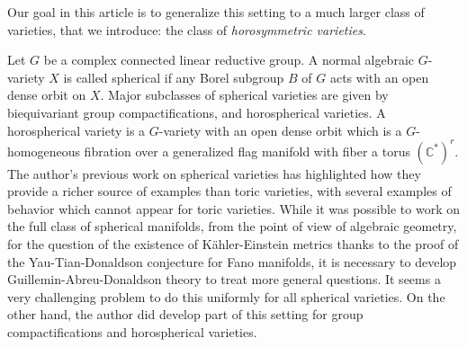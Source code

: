 \documentclass{amsart}
\theoremstyle{definition}
\begin{document}
Our goal in this article is to generalize this setting to a much larger class of 
varieties, that we introduce: the class of \emph{horosymmetric varieties}. 

Let $G$ be a complex connected linear reductive group. A normal algebraic $G$-variety 
$X$ is called spherical if any Borel subgroup $B$ of $G$ acts with an open 
dense orbit on $X$. Major subclasses of spherical varieties are given by 
biequivariant group compactifications, and horospherical varieties. A horospherical 
variety is a $G$-variety with an open dense orbit which is a $G$-homogeneous fibration 
over a generalized flag manifold with fiber a torus $(\mathbb{C}^*)^r$. 
The author's previous work on spherical varieties has highlighted how 
they provide a richer source of examples than toric varieties, with several 
examples of behavior which cannot appear for toric varieties. 
While it was possible to work on the full class of spherical manifolds, 
from the point of view of algebraic geometry, for 
the question of the existence of Kähler-Einstein metrics thanks to the 
proof of the Yau-Tian-Donaldson conjecture for Fano manifolds, it is necessary 
to develop Guillemin-Abreu-Donaldson theory to treat more general questions.
It seems a very challenging problem to do this uniformly for all spherical 
varieties. 
On the other hand, the author did develop part of this setting for group 
compactifications and horospherical varieties. 
\end{document}
